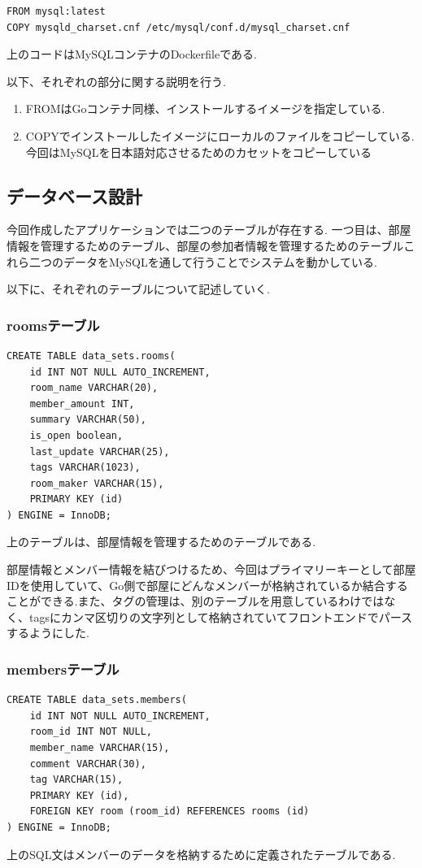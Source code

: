 \documentclass[submit,techrep]{ipsj}
\begin{document}
\begin{verbatim}
FROM mysql:latest
COPY mysqld_charset.cnf /etc/mysql/conf.d/mysql_charset.cnf
\end{verbatim}
上のコードはMySQLコンテナのDockerfileである.

以下、それぞれの部分に関する説明を行う.

\begin{enumerate}
  \item FROMはGoコンテナ同様、インストールするイメージを指定している.
  \item COPYでインストールしたイメージにローカルのファイルをコピーしている.今回はMySQLを日本語対応させるためのカセットをコピーしている
 \end{enumerate}


\subsection{データベース設計}
今回作成したアプリケーションでは二つのテーブルが存在する.
一つ目は、部屋情報を管理するためのテーブル、部屋の参加者情報を管理するためのテーブルこれら二つのデータをMySQLを通して行うことでシステムを動かしている.

以下に、それぞれのテーブルについて記述していく.


\subsubsection{roomsテーブル}
\begin{verbatim}
CREATE TABLE data_sets.rooms( 
    id INT NOT NULL AUTO_INCREMENT, 
    room_name VARCHAR(20), 
    member_amount INT, 
    summary VARCHAR(50), 
    is_open boolean, 
    last_update VARCHAR(25), 
    tags VARCHAR(1023),
    room_maker VARCHAR(15), 
    PRIMARY KEY (id)
) ENGINE = InnoDB;
\end{verbatim}
上のテーブルは、部屋情報を管理するためのテーブルである.

部屋情報とメンバー情報を結びつけるため、今回はプライマリーキーとして部屋IDを使用していて、Go側で部屋にどんなメンバーが格納されているか結合することができる.また、タグの管理は、別のテーブルを用意しているわけではなく、tagsにカンマ区切りの文字列として格納されていてフロントエンドでパースするようにした.


\subsubsection{membersテーブル}
\begin{verbatim}
CREATE TABLE data_sets.members( 
    id INT NOT NULL AUTO_INCREMENT,
    room_id INT NOT NULL, 
    member_name VARCHAR(15),
    comment VARCHAR(30), 
    tag VARCHAR(15),
    PRIMARY KEY (id),
    FOREIGN KEY room (room_id) REFERENCES rooms (id)
) ENGINE = InnoDB; 
\end{verbatim}
上のSQL文はメンバーのデータを格納するために定義されたテーブルである.
\end{document}

